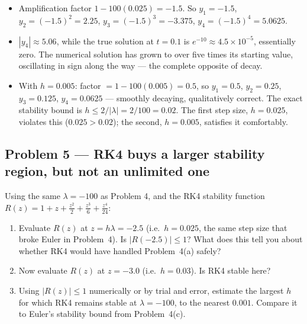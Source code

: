 \solution
\begin{itemize}
\item[(a)] Amplification factor $1-100(0.025) = -1.5$. So $y_1=-1.5$, $y_2=(-1.5)^2=2.25$, $y_3=(-1.5)^3=-3.375$, $y_4=(-1.5)^4=5.0625$.
\item[(b)] $|y_4|\approx5.06$, while the true solution at $t=0.1$ is $e^{-10}\approx4.5\times10^{-5}$, essentially zero. The numerical solution has grown to over five times its starting value, oscillating in sign along the way --- the complete opposite of decay.
\item[(c)] With $h=0.005$: factor $=1-100(0.005)=0.5$, so $y_1=0.5$, $y_2=0.25$, $y_3=0.125$, $y_4=0.0625$ --- smoothly decaying, qualitatively correct. The exact stability bound is $h\le 2/|\lambda| = 2/100 = 0.02$. The first step size, $h=0.025$, violates this ($0.025>0.02$); the second, $h=0.005$, satisfies it comfortably.
\end{itemize}


\subsection*{Problem 5 --- RK4 buys a larger stability region, but not an unlimited one}

Using the same $\lambda=-100$ as Problem 4, and the RK4 stability function $R(z) = 1+z+\tfrac{z^2}{2}+\tfrac{z^3}{6}+\tfrac{z^4}{24}$:

\begin{enumerate}[label=(\alph*)]
\item Evaluate $R(z)$ at $z=h\lambda=-2.5$ (i.e.\ $h=0.025$, the same step size that broke Euler in Problem~4). Is $|R(-2.5)|\le1$? What does this tell you about whether RK4 would have handled Problem~4(a) safely?
\item Now evaluate $R(z)$ at $z=-3.0$ (i.e.\ $h=0.03$). Is RK4 stable here?
\item Using $|R(z)|\le1$ numerically or by trial and error, estimate the largest $h$ for which RK4 remains stable at $\lambda=-100$, to the nearest $0.001$. Compare it to Euler's stability bound from Problem~4(c).
\end{enumerate}

